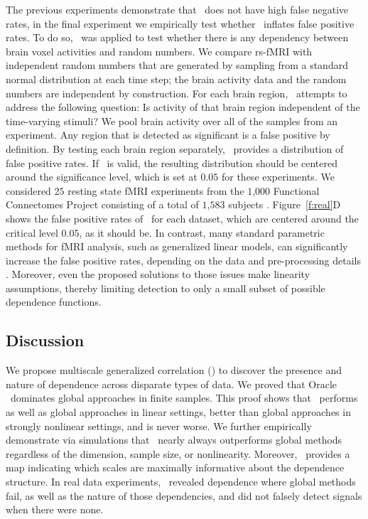 \documentclass[11pt]{article}
\begin{document}
The previous experiments demonstrate that \Mgc~does not have high false negative rates, in the final experiment we empirically test whether \Mgc~inflates false positive rates. To do so, \Mgc~was applied to test whether there is any dependency between brain voxel activities and random numbers.
We compare rs-fMRI with independent random numbers that are generated by sampling from a standard normal distribution at each time step; the brain activity data and the random numbers are independent by construction.
For each brain region, \Mgc~attempts to address the following question: Is activity of that  brain region independent of the time-varying stimuli? We pool brain activity over all of the samples from an experiment.
Any region that is detected as significant is a false positive by definition.  By testing each brain region separately, \Mgc~provides a distribution of false positive rates.  If \Mgc~is valid, the resulting distribution should be centered around the significance level, which is set at $0.05$ for these experiments.
% 
We considered $25$ resting state fMRI experiments from the $1$,$000$ Functional Connectomes Project  consisting of a total of $1$,$583$ subjects \cite{biswal2010toward}.
Figure~\ref{f:real}{\color{magenta}D} shows the false positive rates of  \Mgc~for each dataset, which are centered around the critical level $0.05$, as it should be.
In contrast, many standard parametric methods for fMRI analysis, such as generalized linear models, can significantly increase the false positive rates, depending on the data and pre-processing details \cite{EklundKnutsson2012,Eklund2015}. Moreover, even the proposed solutions to those issues make linearity assumptions, thereby limiting detection to only a small subset of possible dependence functions.

\subsection*{Discussion}
\label{conclu}

We propose multiscale generalized correlation (\Mgc) to discover the presence and nature of dependence across disparate types of data.
We proved that Oracle \Mgc~dominates global approaches in finite samples.  This proof shows that \Mgc~performs as well as global approaches in linear settings, better than global approaches in strongly nonlinear settings, and is never worse. We further empirically demonstrate via simulations that \Mgc~nearly always outperforms global methods regardless of the dimension, sample size, or nonlinearity.  Moreover, \Mgc~provides a map indicating which scales are maximally informative about the dependence structure. 
In real data experiments, \Mgc~revealed dependence where global methods fail, as well as the nature of those dependencies, and did not falsely detect signals when there were none. 
\end{document}
